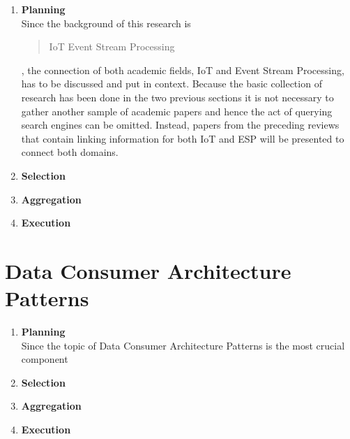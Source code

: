\begin{enumerate}
    \item
    \textbf{Planning}\\
    Since the background of this research is \blockquote{IoT Event Stream Processing}, the connection of both academic fields, IoT and Event Stream Processing, has to be discussed and put in context. Because the basic collection of research has been done in the two previous sections it is not necessary to gather another sample of academic papers and hence the act of querying search engines can be omitted. Instead, papers from the preceding reviews that contain linking information for both IoT and ESP will be presented to connect both domains.
    
    \item
    \textbf{Selection}\\
    
    \item
    \textbf{Aggregation}\\
    
    \item
    \textbf{Execution}\\
    
\end{enumerate}


\section{Data Consumer Architecture Patterns}

\begin{enumerate}
    \item
    \textbf{Planning}\\
    Since the topic of Data Consumer Architecture Patterns is the most crucial component 
    
    \item
    \textbf{Selection}\\
    
    \item
    \textbf{Aggregation}\\
    
    \item
    \textbf{Execution}\\
    
\end{enumerate}

